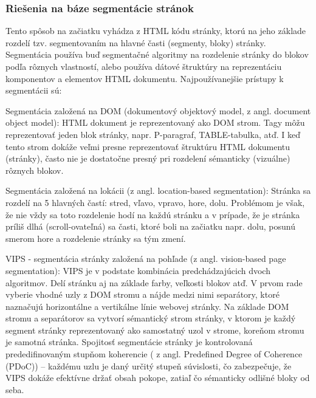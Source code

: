 \subsubsection{Riešenia na báze segmentácie stránok}

	Tento spôsob na začiatku vyhádza z HTML kódu stránky, ktorú na jeho základe rozdelí tzv. segmentovaním na hlavné časti (segmenty, bloky) stránky. Segmentácia používa buď segmentačné algoritmy na rozdelenie stránky do blokov podľa rôznych vlastností, alebo používa dátové štruktúry na reprezentáciu komponentov a elementov HTML dokumentu. 
    Najpoužívanejšie prístupy k segmentácii sú:
\begin{my_itemize}
	\item {Segmentácia založená na DOM\cite{DOM} (dokumentový objektový model, z angl. document object model):}
	\newline
\hspace{10mm}HTML dokument je reprezentovaný ako DOM strom. Tagy môžu reprezentovať jeden blok stránky, napr. P-paragraf, TABLE-tabulka, atď. I keď tento strom dokáže veľmi presne reprezentovať štruktúru HTML dokumentu (stránky), často nie je dostatočne presný pri 	rozdelení sémanticky (vizuálne) rôznych blokov. 
	\item {Segmentácia založená na lokácii\cite{block_importance} (z angl. location-based segmentation):}
	\newline
\hspace{10mm}Stránka sa rozdelí na 5 hlavných častí: stred, vľavo, vpravo, hore, dolu. Problémom je však, že nie vždy sa toto rozdelenie hodí na každú stránku a v prípade, že je stránka príliš dlhá (scroll-ovateľná) sa časti, ktoré boli na začiatku napr. dolu, posunú smerom hore a rozdelenie stránky sa tým zmení. 
	\item {VIPS\cite{vips} - segmentácia stránky založená na pohľade (z angl. vision-based page segmentation):}
	\newline
\hspace{10mm}VIPS je v podstate kombinácia predchádzajúcich dvoch algoritmov. Delí stránku aj na základe farby, veľkosti blokov atď. V prvom rade vyberie vhodné uzly z DOM stromu a nájde medzi nimi separátory, ktoré naznačujú horizontálne a vertikálne línie webovej stránky. Na základe DOM stromu a separátorov sa vytvorí sémantický strom stránky, v ktorom je každý segment stránky reprezentovaný ako samostatný uzol v strome, koreňom stromu je samotná stránka. Spojitosť segmentácie stránky je kontrolovaná prededifinovaným stupňom koherencie ( z angl. Predefined Degree of Coherence (PDoC\cite{PDOC})) – každému uzlu je daný určitý stupeň súvislosti, čo zabezpečuje, že VIPS dokáže efektívne držať obsah pokope, zatiaľ čo sémanticky odlišné bloky od seba.
\end{my_itemize}

